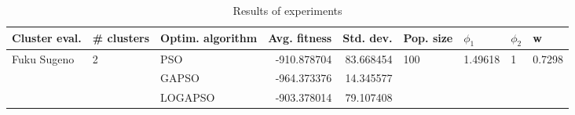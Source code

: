 \begin{table}
\centering
\caption{Results of experiments}
\begin{tabular}{lllrrllll}
\toprule
               Cluster eval. &        \# clusters & Optim. algorithm &  Avg. fitness &  Std. dev. &            Pop. size &               $\phi_{1}$ &         $\phi_{2}$ &                       w \\
\midrule
\multirow{3}{*}{Fuku Sugeno} & \multirow{3}{*}{2} &              PSO &   -910.878704 &  83.668454 & \multirow{3}{*}{100} & \multirow{3}{*}{1.49618} & \multirow{3}{*}{1} & \multirow{3}{*}{0.7298} \\
                             &                    &            GAPSO &   -964.373376 &  14.345577 &                      &                          &                    &                         \\
                             &                    &          LOGAPSO &   -903.378014 &  79.107408 &                      &                          &                    &                         \\
\bottomrule
\end{tabular}
\end{table}
